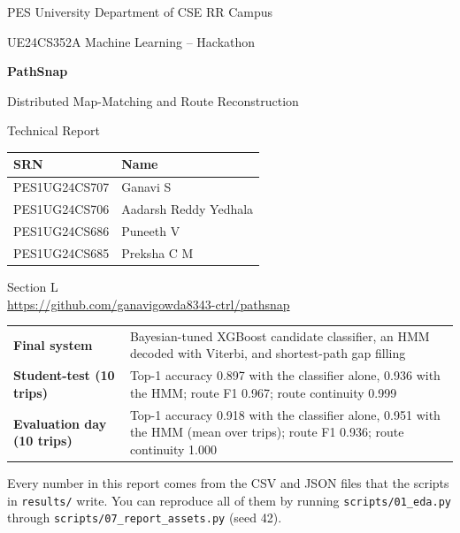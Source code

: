 \documentclass[11pt,a4paper]{article}
\newcommand{\code}[1]{\texttt{\small #1}}
\begin{document}
\begin{titlepage}
\centering
{\small PES University \textperiodcentered{} Department of CSE \textperiodcentered{} RR Campus\par}
{\small UE24CS352A Machine Learning -- Hackathon\par}
\vspace{3cm}
{\Huge\bfseries\color{accent} PathSnap\par}
\vspace{0.4cm}
{\LARGE Distributed Map-Matching and Route Reconstruction\par}
\vspace{0.4cm}
{\large Technical Report\par}
\vspace{2.5cm}

\begin{tabular}{ll}
\toprule
\textbf{SRN} & \textbf{Name} \\
\midrule
PES1UG24CS707 & Ganavi S \\
PES1UG24CS706 & Aadarsh Reddy Yedhala \\
PES1UG24CS686 & Puneeth V \\
PES1UG24CS685 & Preksha C M \\
\bottomrule
\end{tabular}

\vspace{0.8cm}
Section L \\[0.3em]
\url{https://github.com/ganavigowda8343-ctrl/pathsnap}

\vfill
\begin{tabularx}{0.92\textwidth}{@{}lY@{}}
\toprule
\textbf{Final system} & Bayesian-tuned XGBoost candidate classifier, an HMM decoded with Viterbi, and shortest-path gap filling \\
\textbf{Student-test (10 trips)} & Top-1 accuracy 0.897 with the classifier alone, 0.936 with the HMM; route F1 0.967; route continuity 0.999 \\
\textbf{Evaluation day (10 trips)} & Top-1 accuracy 0.918 with the classifier alone, 0.951 with the HMM (mean over trips); route F1 0.936; route continuity 1.000 \\
\bottomrule
\end{tabularx}

\vspace{0.6cm}
{\small Every number in this report comes from the CSV and JSON files that the scripts in \code{results/} write.
You can reproduce all of them by running \code{scripts/01\_eda.py} through \code{scripts/07\_report\_assets.py} (seed 42).\par}
\end{titlepage}
\end{document}

